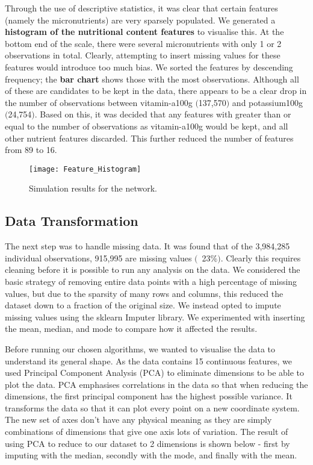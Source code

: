 \documentclass[journal]{IEEEtran}
\begin{document}
Through the use of descriptive statistics, it was clear that certain features (namely the micronutrients) are very sparsely populated. We generated a \textbf{ histogram of the nutritional content features} to visualise this. At the bottom end of the scale, there were several micronutrients with only 1 or 2 observations in total. Clearly, attempting to insert missing values for these features would introduce too much bias. We sorted the features by descending frequency; the \textbf{bar chart} shows those with the most observations. Although all of these are candidates to be kept in the data, there appears to be a clear drop in the number of observations between vitamin-a\textunderscore 100g $($137,570$)$ and potassium\textunderscore 100g $($24,754$)$. Based on this, it was decided that any features with greater than or equal to the number of observations as vitamin-a\textunderscore100g would be kept, and all other nutrient features discarded. This further reduced the number of features from 89 to 16.

\begin{figure}[ht]
\centering
\texttt{[image: Feature\_Histogram]}
\caption{Simulation results for the network.}
\end{figure}


\subsection{Data Transformation}
The next step was to handle missing data. It was found that of the 3,984,285 individual observations, 915,995 are missing values $($~23\%$)$. Clearly this requires cleaning before it is possible to run any analysis on the data. We considered the basic strategy of removing entire data points with a high percentage of missing values, but due to the sparsity of many rows and columns, this reduced the dataset down to a fraction of the original size. We instead opted to impute missing values using the sklearn Imputer library. We experimented with inserting the mean, median, and mode to compare how it affected the results.

Before running our chosen algorithms, we wanted to visualise the data to understand its general shape. As the data contains 15 continuous features, we used Principal Component Analysis (PCA) to eliminate dimensions to be able to plot the data. PCA emphasises correlations in the data so that when reducing the dimensions, the first principal component has the highest possible variance. It transforms the data so that it can plot every point on a new coordinate system. The new set of axes don’t have any physical meaning as they are simply combinations of dimensions that give one axis lots of variation. The result of using PCA to reduce to our dataset to 2 dimensions is shown below - first by imputing with the median, secondly with the mode, and finally with the mean.
\end{document}
